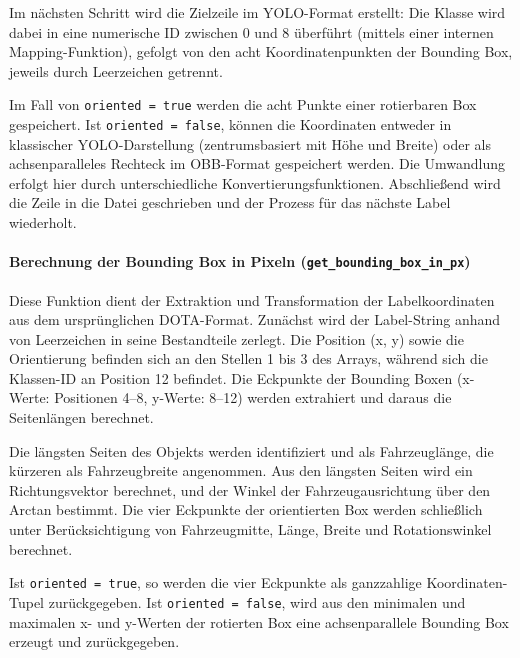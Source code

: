 Im nächsten Schritt wird die Zielzeile im YOLO-Format erstellt: Die Klasse wird dabei in eine numerische ID zwischen 0 und 8 überführt (mittels einer internen Mapping-Funktion), gefolgt von den acht Koordinatenpunkten der Bounding Box, jeweils durch Leerzeichen getrennt.

Im Fall von \texttt{oriented = true} werden die acht Punkte einer rotierbaren Box gespeichert. Ist \texttt{oriented = false}, können die Koordinaten entweder in klassischer YOLO-Darstellung (zentrumsbasiert mit Höhe und Breite) oder als achsenparalleles Rechteck im OBB-Format gespeichert werden. Die Umwandlung erfolgt hier durch unterschiedliche Konvertierungsfunktionen. Abschließend wird die Zeile in die Datei geschrieben und der Prozess für das nächste Label wiederholt.

\paragraph{Berechnung der Bounding Box in Pixeln (\texttt{get\_bounding\_box\_in\_px})}

Diese Funktion dient der Extraktion und Transformation der Labelkoordinaten aus dem ursprünglichen DOTA-Format. Zunächst wird der Label-String anhand von Leerzeichen in seine Bestandteile zerlegt. Die Position (x, y) sowie die Orientierung befinden sich an den Stellen 1 bis 3 des Arrays, während sich die Klassen-ID an Position 12 befindet. Die Eckpunkte der Bounding Boxen (x-Werte: Positionen 4–8, y-Werte: 8–12) werden extrahiert und daraus die Seitenlängen berechnet.

Die längsten Seiten des Objekts werden identifiziert und als Fahrzeuglänge, die kürzeren als Fahrzeugbreite angenommen. Aus den längsten Seiten wird ein Richtungsvektor berechnet, und der Winkel der Fahrzeugausrichtung über den Arctan bestimmt. Die vier Eckpunkte der orientierten Box werden schließlich unter Berücksichtigung von Fahrzeugmitte, Länge, Breite und Rotationswinkel berechnet.

Ist \texttt{oriented = true}, so werden die vier Eckpunkte als ganzzahlige Koordinaten-Tupel zurückgegeben. Ist \texttt{oriented = false}, wird aus den minimalen und maximalen x- und y-Werten der rotierten Box eine achsenparallele Bounding Box erzeugt und zurückgegeben.

